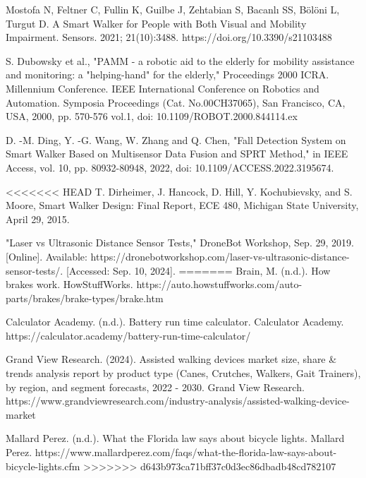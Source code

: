 \begin{thebibliography}{45}
	
	 Mostofa N, Feltner C, Fullin K, Guilbe J, Zehtabian S, Bacanlı SS, Bölöni L, Turgut D. A Smart Walker for People with Both Visual and Mobility Impairment. Sensors. 2021; 21(10):3488. https://doi.org/10.3390/s21103488
	
	 S. Dubowsky et al., "PAMM - a robotic aid to the elderly for mobility assistance and monitoring: a "helping-hand" for the elderly," Proceedings 2000 ICRA. Millennium Conference. IEEE International Conference on Robotics and Automation. Symposia Proceedings (Cat. No.00CH37065), San Francisco, CA, USA, 2000, pp. 570-576 vol.1, doi: 10.1109/ROBOT.2000.844114.ex
	
	 D. -M. Ding, Y. -G. Wang, W. Zhang and Q. Chen, "Fall Detection System on Smart Walker Based on Multisensor Data Fusion and SPRT Method," in IEEE Access, vol. 10, pp. 80932-80948, 2022, doi: 10.1109/ACCESS.2022.3195674.
	
<<<<<<< HEAD
	 T. Dirheimer, J. Hancock, D. Hill, Y. Kochubievsky, and S. Moore, Smart Walker Design: Final Report, ECE 480, Michigan State University, April 29, 2015.
	
	 "Laser vs Ultrasonic Distance Sensor Tests," DroneBot Workshop, Sep. 29, 2019. [Online]. Available: https://dronebotworkshop.com/laser-vs-ultrasonic-distance-sensor-tests/. [Accessed: Sep. 10, 2024].
=======
	 Brain, M. (n.d.). How brakes work. HowStuffWorks. https://auto.howstuffworks.com/auto-parts/brakes/brake-types/brake.htm
	
	 Calculator Academy. (n.d.). Battery run time calculator. Calculator Academy. https://calculator.academy/battery-run-time-calculator/ 
	
	 Grand View Research. (2024). Assisted walking devices market size, share & trends analysis report by product type (Canes, Crutches, Walkers, Gait Trainers), by region, and segment forecasts, 2022 - 2030. Grand View Research. https://www.grandviewresearch.com/industry-analysis/assisted-walking-device-market
	
	 Mallard Perez. (n.d.). What the Florida law says about bicycle lights. Mallard Perez. https://www.mallardperez.com/faqs/what-the-florida-law-says-about-bicycle-lights.cfm 
>>>>>>> d643b973ca71bff37c0d3ec86dbadb48cd782107
	
\end{thebibliography}